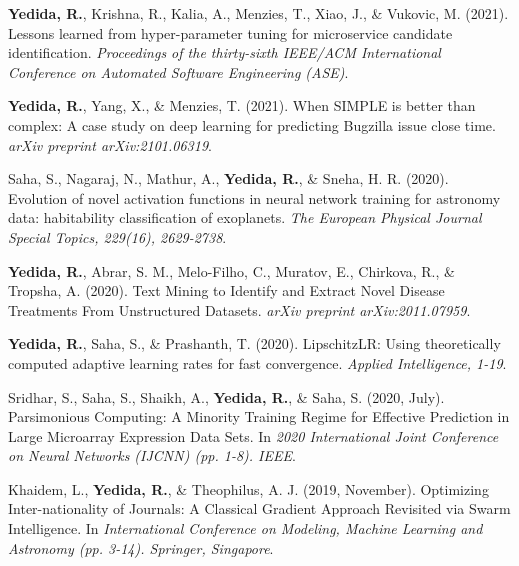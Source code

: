     \item
      {\textbf{Yedida, R.}, Krishna, R., Kalia, A., Menzies, T., Xiao, J., \& Vukovic, M. (2021). Lessons learned from hyper-parameter tuning for microservice candidate identification. \textit{Proceedings of the thirty-sixth IEEE/ACM International Conference on Automated Software Engineering (ASE)}.
      }
    \item
      {\textbf{Yedida, R.}, Yang, X., \& Menzies, T. (2021). When SIMPLE is better than complex: A case study on deep learning for predicting Bugzilla issue close time. \textit{arXiv preprint arXiv:2101.06319}.}
    \item
      {Saha, S., Nagaraj, N., Mathur, A., \textbf{Yedida, R.}, \& Sneha, H. R. (2020). Evolution of novel activation functions in neural network training for astronomy data: habitability classification of exoplanets. \textit{The European Physical Journal Special Topics, 229(16), 2629-2738}.}
    \item
      {\textbf{Yedida, R.}, Abrar, S. M., Melo-Filho, C., Muratov, E., Chirkova, R., \& Tropsha, A. (2020). Text Mining to Identify and Extract Novel Disease Treatments From Unstructured Datasets. \textit{arXiv preprint arXiv:2011.07959}.}
    \item
      {\textbf{Yedida, R.}, Saha, S., \& Prashanth, T. (2020). LipschitzLR: Using theoretically computed adaptive learning rates for fast convergence. \textit{Applied Intelligence, 1-19}.}
    \item
      {Sridhar, S., Saha, S., Shaikh, A., \textbf{Yedida, R.}, \& Saha, S. (2020, July). Parsimonious Computing: A Minority Training Regime for Effective Prediction in Large Microarray Expression Data Sets. In \textit{2020 International Joint Conference on Neural Networks (IJCNN) (pp. 1-8). IEEE}.}
    \item
      {Khaidem, L., \textbf{Yedida, R.}, \& Theophilus, A. J. (2019, November). Optimizing Inter-nationality of Journals: A Classical Gradient Approach Revisited via Swarm Intelligence. In \textit{International Conference on Modeling, Machine Learning and Astronomy (pp. 3-14). Springer, Singapore}.}
 \resumeSubHeadingListEnd